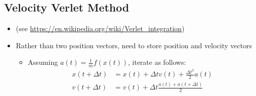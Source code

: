 \documentclass{article}
\begin{document}
\subsection*{Velocity Verlet Method}
\begin{itemize}
    \item (see \url{https://en.wikipedia.org/wiki/Verlet_integration})
    \item Rather than two position vectors, need to store position and velocity vectors
    \begin{itemize}
        \item Assuming $a(t) = \frac{1}{m} f(x(t))$, iterate as follows:
        \begin{align*}
            x(t + \Delta t) &= x(t) + \Delta t v(t) + \frac{\Delta t^2}{2} a(t)\\
            v(t + \Delta t) &= v(t) + \Delta t \frac{a(t) + a(t + \Delta t)}{2}
        \end{align*}
    \end{itemize}
\end{itemize}
\end{document}
